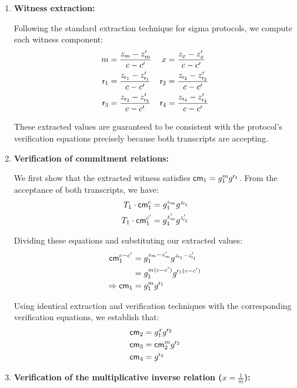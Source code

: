 \begin{enumerate}
    \item \textbf{Witness extraction:}
    
    Following the standard extraction technique for sigma protocols, we compute each witness component:
    \begin{align}
    m &= \frac{z_m - z'_m}{c - c'} & x &= \frac{z_x - z'_x}{c - c'} \\
    \mathsf{r}_1 &= \frac{z_{\mathsf{r}_1} - z'_{\mathsf{r}_1}}{c - c'} & \mathsf{r}_2 &= \frac{z_{\mathsf{r}_2} - z'_{\mathsf{r}_2}}{c - c'} \\
    \mathsf{r}_3 &= \frac{z_{\mathsf{r}_3} - z'_{\mathsf{r}_3}}{c - c'} & \mathsf{r}_4 &= \frac{z_{\mathsf{r}_4} - z'_{\mathsf{r}_4}}{c - c'}
    \end{align}
    
    These extracted values are guaranteed to be consistent with the protocol's verification equations precisely because both transcripts are accepting.
    
    \item \textbf{Verification of commitment relations:}
    
    We first show that the extracted witness satisfies $\mathsf{cm}_1 = g_1^m g^{\mathsf{r}_1}$. From the acceptance of both transcripts, we have:
    \begin{align}
        T_1 \cdot \mathsf{cm}_1^c &= g_1^{z_m} g^{z_{\mathsf{r}_1}} \\
        T_1 \cdot \mathsf{cm}_1^{c'} &= g_1^{z'_m} g^{z'_{\mathsf{r}_1}}
    \end{align}
    
    Dividing these equations and substituting our extracted values:
    \begin{align}
        \mathsf{cm}_1^{c-c'} &= g_1^{z_m-z'_m} g^{z_{\mathsf{r}_1}-z'_{\mathsf{r}_1}} \\
        &= g_1^{m(c-c')} g^{\mathsf{r}_1(c-c')} \\
        \Rightarrow \mathsf{cm}_1 &= g_1^m g^{\mathsf{r}_1}
    \end{align}
    
    Using identical extraction and verification techniques with the corresponding verification equations, we establish that:
    \begin{align}
        \mathsf{cm}_2 &= g_1^x g^{\mathsf{r}_2} \\
        \mathsf{cm}_3 &= \mathsf{cm}_2^m g^{\mathsf{r}_3} \\
        \mathsf{cm}_4 &= g^{\mathsf{r}_4}
    \end{align}
    
    \item \textbf{Verification of the multiplicative inverse relation ($x = \frac{1}{m}$):}
    

\end{enumerate}
